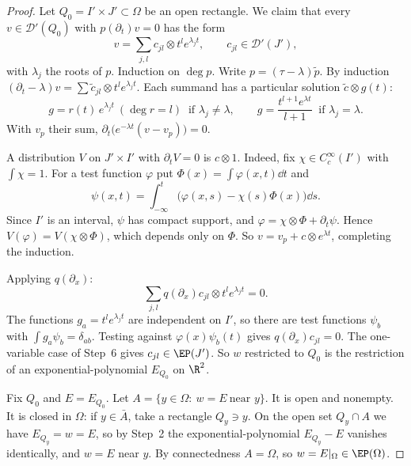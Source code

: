 \begin{proof}
Let $Q_0=I'\times J'\subset\Omega$ be an open rectangle. We claim that every $v\in\mathcal D'(Q_0)$ with $p(\partial_t)v=0$ has the form
\[
v=\sum_{j,l}c_{jl}\otimes t^le^{\lambda_jt},\qquad c_{jl}\in\mathcal D'(J'),
\]
with $\lambda_j$ the roots of $p$. Induction on $\deg p$. Write $p=(\tau-\lambda)\tilde p$. By induction $(\partial_t-\lambda)v=\sum\tilde c_{jl}\otimes t^le^{\lambda_jt}$. Each summand has a particular solution $\tilde c\otimes g(t)$:
\[
g=r(t)\,e^{\lambda_jt}\ (\deg r=l)\ \text{ if }\lambda_j\ne\lambda,\qquad g=\frac{t^{l+1}e^{\lambda t}}{l+1}\ \text{ if }\lambda_j=\lambda .
\]
With $v_p$ their sum, $\partial_t\big(e^{-\lambda t}(v-v_p)\big)=0$.

A distribution $V$ on $J'\times I'$ with $\partial_tV=0$ is $c\otimes1$. Indeed, fix $\chi\in C_c^\infty(I')$ with $\int\chi=1$. For a test function $\varphi$ put $\Phi(x)=\int\varphi(x,t)\dd t$ and
\[
\psi(x,t)=\int_{-\infty}^t\big(\varphi(x,s)-\chi(s)\Phi(x)\big)\dd s .
\]
Since $I'$ is an interval, $\psi$ has compact support, and $\varphi=\chi\otimes\Phi+\partial_t\psi$. Hence $V(\varphi)=V(\chi\otimes\Phi)$, which depends only on $\Phi$. So $v=v_p+c\otimes e^{\lambda t}$, completing the induction.

Applying $q(\partial_x)$:
\[
\sum_{j,l}q(\partial_x)c_{jl}\otimes t^le^{\lambda_jt}=0 .
\]
The functions $g_a=t^le^{\lambda_jt}$ are independent on $I'$, so there are test functions $\psi_b$ with $\int g_a\psi_b=\delta_{ab}$. Testing against $\varphi(x)\psi_b(t)$ gives $q(\partial_x)c_{jl}=0$. The one-variable case of Step~6 gives $c_{jl}\in\EP(J')$. So $w$ restricted to $Q_0$ is the restriction of an exponential-polynomial $E_{Q_0}$ on $\R^2$.

Fix $Q_0$ and $E=E_{Q_0}$. Let $A=\{y\in\Omega:\ w=E\ \text{near }y\}$. It is open and nonempty. It is closed in $\Omega$: if $y\in\bar A$, take a rectangle $Q_y\ni y$. On the open set $Q_y\cap A$ we have $E_{Q_y}=w=E$, so by Step~2 the exponential-polynomial $E_{Q_y}-E$ vanishes identically, and $w=E$ near $y$. By connectedness $A=\Omega$, so $w=E|_\Omega\in\EP(\Omega)$.

\end{proof}

